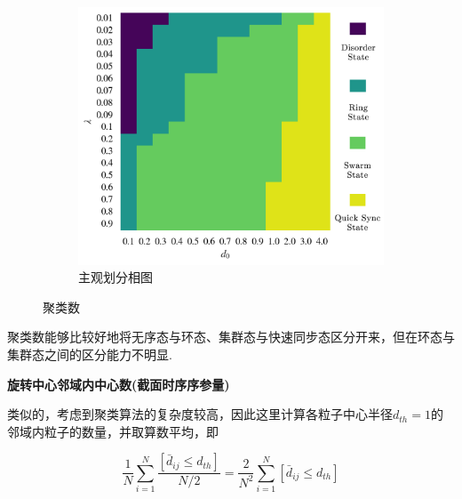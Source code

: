 \documentclass{article}
\begin{document}
\begin{figure}[H]
	\begin{subfigure}[b]{0.49\textwidth}
		\includegraphics[width=\textwidth]{./figs/subjectiveOp.png}
		\vspace{-1cm}
		\caption{主观划分相图}
	\end{subfigure}

	\vspace{-0.5cm}
	\caption{聚类数}
	\label{fig:fig234c.7}
\end{figure}

聚类数能够比较好地将无序态与环态、集群态与快速同步态区分开来，但在环态与集群态之间的区分能力不明显.

\noindent\textbf{旋转中心邻域内中心数(截面时序序参量)}

类似的，考虑到聚类算法的复杂度较高，因此这里计算各粒子中心半径$d_{th}=1$的邻域内粒子的数量，并取算数平均，即

$$
\frac{1}{N}\sum_{i=1}^N{\frac{\left[ \bar{d}_{ij}\le d_{th} \right]}{N/2}}=\frac{2}{N^2}\sum_{i=1}^N{\left[ \bar{d}_{ij}\le d_{th} \right]}
$$
\end{document}
